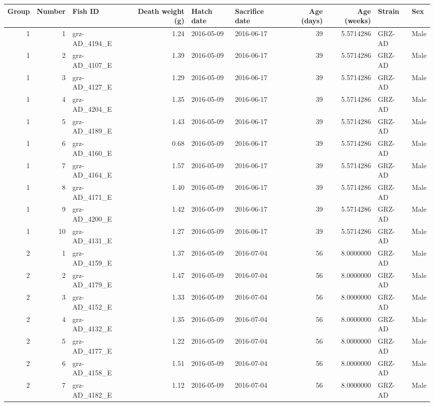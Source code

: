 \begin{tabular}{rrlrllrrll}
  \toprule Group & Number & Fish ID\tnote{1} & Death weight (g) & Hatch date & Sacrifice date & Age (days) & Age (weeks) & Strain & Sex \\ 
  \midrule 1 & 1 & grz-AD\_4194\_E & 1.24 & 2016-05-09 & 2016-06-17 & 39 & 5.5714286 & GRZ-AD & Male \\ 
  1 & 2 & grz-AD\_4107\_E & 1.39 & 2016-05-09 & 2016-06-17 & 39 & 5.5714286 & GRZ-AD & Male \\ 
  1 & 3 & grz-AD\_4127\_E & 1.29 & 2016-05-09 & 2016-06-17 & 39 & 5.5714286 & GRZ-AD & Male \\ 
  1 & 4 & grz-AD\_4204\_E & 1.35 & 2016-05-09 & 2016-06-17 & 39 & 5.5714286 & GRZ-AD & Male \\ 
  1 & 5 & grz-AD\_4189\_E & 1.43 & 2016-05-09 & 2016-06-17 & 39 & 5.5714286 & GRZ-AD & Male \\ 
  1 & 6 & grz-AD\_4160\_E & 0.68 & 2016-05-09 & 2016-06-17 & 39 & 5.5714286 & GRZ-AD & Male \\ 
  1 & 7 & grz-AD\_4164\_E & 1.57 & 2016-05-09 & 2016-06-17 & 39 & 5.5714286 & GRZ-AD & Male \\ 
  1 & 8 & grz-AD\_4171\_E & 1.40 & 2016-05-09 & 2016-06-17 & 39 & 5.5714286 & GRZ-AD & Male \\ 
  1 & 9 & grz-AD\_4200\_E & 1.42 & 2016-05-09 & 2016-06-17 & 39 & 5.5714286 & GRZ-AD & Male \\ 
  1 & 10 & grz-AD\_4131\_E & 1.27 & 2016-05-09 & 2016-06-17 & 39 & 5.5714286 & GRZ-AD & Male \\ 
  2 & 1 & grz-AD\_4159\_E & 1.37 & 2016-05-09 & 2016-07-04 & 56 & 8.0000000 & GRZ-AD & Male \\ 
  2 & 2 & grz-AD\_4179\_E & 1.47 & 2016-05-09 & 2016-07-04 & 56 & 8.0000000 & GRZ-AD & Male \\ 
  2 & 3 & grz-AD\_4152\_E & 1.33 & 2016-05-09 & 2016-07-04 & 56 & 8.0000000 & GRZ-AD & Male \\ 
  2 & 4 & grz-AD\_4132\_E & 1.35 & 2016-05-09 & 2016-07-04 & 56 & 8.0000000 & GRZ-AD & Male \\ 
  2 & 5 & grz-AD\_4177\_E & 1.22 & 2016-05-09 & 2016-07-04 & 56 & 8.0000000 & GRZ-AD & Male \\ 
  2 & 6 & grz-AD\_4158\_E & 1.51 & 2016-05-09 & 2016-07-04 & 56 & 8.0000000 & GRZ-AD & Male \\ 
  2 & 7 & grz-AD\_4182\_E & 1.12 & 2016-05-09 & 2016-07-04 & 56 & 8.0000000 & GRZ-AD & Male \\ 

\end{tabular}
